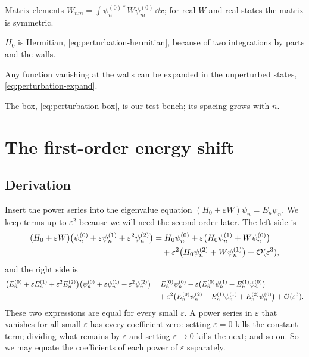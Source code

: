\begin{keyideas}
\item Matrix elements $W_{nm}=\int\psi_n^{(0)*}W\psi_m^{(0)}\,\dd x$; for real $W$ and real states the matrix is symmetric.
\item $H_0$ is Hermitian, \cref{eq:perturbation-hermitian}, because of two integrations by parts and the walls.
\item Any function vanishing at the walls can be expanded in the unperturbed states, \cref{eq:perturbation-expand}.
\item The box, \cref{eq:perturbation-box}, is our test bench; its spacing grows with $n$.
\end{keyideas}

\section{The first-order energy shift}\label{sec:perturbation-first}

\subsection{Derivation}

Insert the power series into the eigenvalue equation $(H_0+\varepsilon W)\psi_n=E_n\psi_n$. We keep terms up to $\varepsilon^2$ because we will need the second order later. The left side is
\begin{align*}
(H_0+\varepsilon W)\bigl(\psi_n^{(0)}+\varepsilon\psi_n^{(1)}+\varepsilon^2\psi_n^{(2)}\bigr)
&=H_0\psi_n^{(0)}
+\varepsilon\bigl(H_0\psi_n^{(1)}+W\psi_n^{(0)}\bigr)\\
&\quad+\varepsilon^2\bigl(H_0\psi_n^{(2)}+W\psi_n^{(1)}\bigr)+\mathcal{O}(\varepsilon^3),
\end{align*}
and the right side is
\begin{align*}
\bigl(E_n^{(0)}+\varepsilon E_n^{(1)}+\varepsilon^2E_n^{(2)}\bigr)\bigl(\psi_n^{(0)}+\varepsilon\psi_n^{(1)}+\varepsilon^2\psi_n^{(2)}\bigr)
&=E_n^{(0)}\psi_n^{(0)}
+\varepsilon\bigl(E_n^{(0)}\psi_n^{(1)}+E_n^{(1)}\psi_n^{(0)}\bigr)\\
&\quad+\varepsilon^2\bigl(E_n^{(0)}\psi_n^{(2)}+E_n^{(1)}\psi_n^{(1)}+E_n^{(2)}\psi_n^{(0)}\bigr)+\mathcal{O}(\varepsilon^3).
\end{align*}
These two expressions are equal for every small $\varepsilon$. A power series in $\varepsilon$ that vanishes for all small $\varepsilon$ has every coefficient zero: setting $\varepsilon=0$ kills the constant term; dividing what remains by $\varepsilon$ and setting $\varepsilon\to0$ kills the next; and so on. So we may equate the coefficients of each power of $\varepsilon$ separately.

